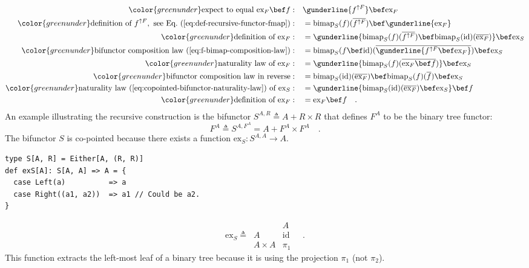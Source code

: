 \begin{align*}
{\color{greenunder}\text{expect to equal }\text{ex}_{F}\bef f:}\quad & \gunderline{f^{\uparrow F}}\bef\text{ex}_{F}\\
{\color{greenunder}\text{definition of }f^{\uparrow F},\text{ see Eq.~(\ref{eq:def-recursive-functor-fmap})}:}\quad & =\text{bimap}_{S}(f)(\overline{f^{\uparrow F}})\bef\gunderline{\text{ex}_{F}}\\
{\color{greenunder}\text{definition of }\text{ex}_{F}:}\quad & =\gunderline{\text{bimap}_{S}(f)(\overline{f^{\uparrow F}})\bef\text{bimap}_{S}(\text{id})(\overline{\text{ex}_{F}})}\bef\text{ex}_{S}\\
{\color{greenunder}\text{bifunctor composition law~(\ref{eq:f-bimap-composition-law})}:}\quad & =\text{bimap}_{S}(f\bef\text{id})(\overline{\gunderline{f^{\uparrow F}\bef\text{ex}_{F}}})\bef\text{ex}_{S}\\
{\color{greenunder}\text{naturality law of }\text{ex}_{F}:}\quad & =\gunderline{\text{bimap}_{S}(f)(\overline{\text{ex}_{F}\bef f})}\bef\text{ex}_{S}\\
{\color{greenunder}\text{bifunctor composition law in reverse}:}\quad & =\text{bimap}_{S}(\text{id})(\overline{\text{ex}_{F}})\bef\text{bimap}_{S}(f)(\overline{f})\bef\text{ex}_{S}\\
{\color{greenunder}\text{naturality law~(\ref{eq:copointed-bifunctor-naturality-law}) of }\text{ex}_{S}:}\quad & =\gunderline{\text{bimap}_{S}(\text{id})(\overline{\text{ex}_{F}})\bef\text{ex}_{S}}\bef f\\
{\color{greenunder}\text{definition of }\text{ex}_{F}:}\quad & =\text{ex}_{F}\bef f\quad.
\end{align*}
An example illustrating the recursive construction is the bifunctor
$S^{A,R}\triangleq A+R\times R$ that defines $F^{A}$ to be the binary
tree functor:
\[
F^{A}\triangleq S^{A,F^{A}}=A+F^{A}\times F^{A}\quad.
\]
The bifunctor $S$ is co-pointed because there exists a function $\text{ex}_{S}:S^{A,A}\rightarrow A$.
\begin{lstlisting}
type S[A, R] = Either[A, (R, R)]
def exS[A]: S[A, A] => A = {
  case Left(a)          => a
  case Right((a1, a2))  => a1 // Could be a2.
}
\end{lstlisting}
\vspace{0.2\baselineskip}
\[
\text{ex}_{S}\triangleq\,\begin{array}{|c||c|}
 & A\\
\hline A & \text{id}\\
A\times A & \pi_{1}
\end{array}\quad.
\]
This function extracts the left-most leaf of a binary tree because
it is using the projection $\pi_{1}$ (not $\pi_{2}$).

